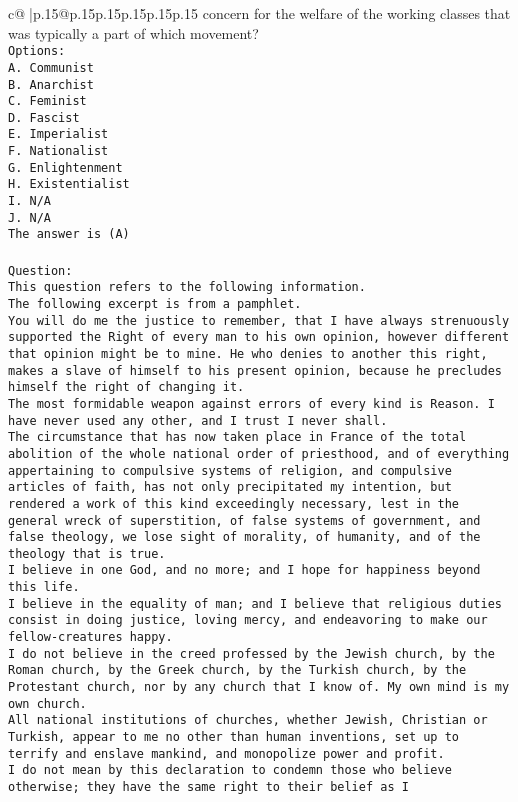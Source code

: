 \documentclass{article}
\begin{document}
{\begin{supertabular}{c@{$\;$}|p{.15\linewidth}@{}p{.15\linewidth}p{.15\linewidth}p{.15\linewidth}p{.15\linewidth}p{.15\linewidth}}
{{{concern for the welfare of the working classes that was typically a part of which movement?\\ \tt Options:\\ \tt A. Communist\\ \tt B. Anarchist\\ \tt C. Feminist\\ \tt D. Fascist\\ \tt E. Imperialist\\ \tt F. Nationalist\\ \tt G. Enlightenment\\ \tt H. Existentialist\\ \tt I. N/A\\ \tt J. N/A\\ \tt The answer is (A)\\ \tt \\ \tt Question:\\ \tt This question refers to the following information.\\ \tt The following excerpt is from a pamphlet.\\ \tt You will do me the justice to remember, that I have always strenuously supported the Right of every man to his own opinion, however different that opinion might be to mine. He who denies to another this right, makes a slave of himself to his present opinion, because he precludes himself the right of changing it.\\ \tt The most formidable weapon against errors of every kind is Reason. I have never used any other, and I trust I never shall.\\ \tt The circumstance that has now taken place in France of the total abolition of the whole national order of priesthood, and of everything appertaining to compulsive systems of religion, and compulsive articles of faith, has not only precipitated my intention, but rendered a work of this kind exceedingly necessary, lest in the general wreck of superstition, of false systems of government, and false theology, we lose sight of morality, of humanity, and of the theology that is true.\\ \tt I believe in one God, and no more; and I hope for happiness beyond this life.\\ \tt I believe in the equality of man; and I believe that religious duties consist in doing justice, loving mercy, and endeavoring to make our fellow-creatures happy.\\ \tt I do not believe in the creed professed by the Jewish church, by the Roman church, by the Greek church, by the Turkish church, by the Protestant church, nor by any church that I know of. My own mind is my own church.\\ \tt All national institutions of churches, whether Jewish, Christian or Turkish, appear to me no other than human inventions, set up to terrify and enslave mankind, and monopolize power and profit.\\ \tt I do not mean by this declaration to condemn those who believe otherwise; they have the same right to their belief as I }}}
\end{supertabular}}
\end{document}
